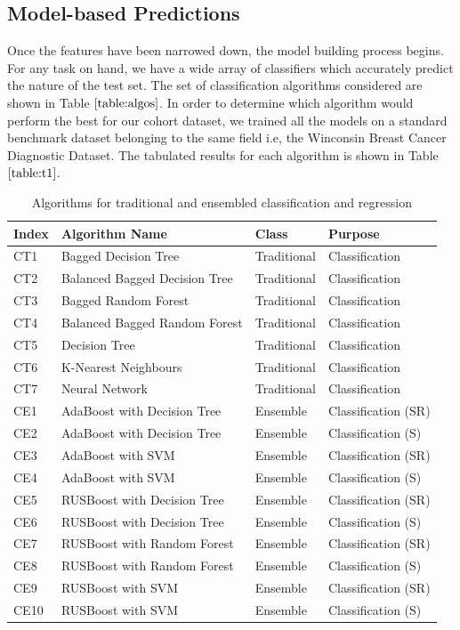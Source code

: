 \documentclass[10pt,journal,compsoc]{IEEEtran}
\begin{document}
\subsection{Model-based Predictions}

Once the features have been narrowed down, the model building process begins. For any task on hand, we have a wide array of classifiers which accurately predict the nature of the test set. The set of classification algorithms considered are shown in Table $\ref{table:algos}$. In order to determine which algorithm would perform the best for our cohort dataset, we trained all the models on a standard benchmark dataset belonging to the same field i.e, the Winconsin Breast Cancer Diagnostic Dataset. The tabulated results for each algorithm is shown in Table $\ref{table:t1}$.

\begin{table}[!t]
\caption{Algorithms for traditional and ensembled classification and regression}
\label{table:algos}
\centering
\scalebox{0.88}
{
\begin{tabular}{| l | l | l | l | }
\hline
\textbf{Index} & \textbf{Algorithm Name} & \textbf{Class} & \textbf{Purpose} \\
\hline
CT1 & Bagged Decision Tree & Traditional & Classification \\
\hline
CT2 & Balanced Bagged Decision Tree & Traditional &  Classification \\
\hline
CT3 & Bagged Random Forest & Traditional &  Classification \\
\hline
CT4 & Balanced Bagged Random Forest & Traditional & Classification \\
\hline
CT5 & Decision Tree & Traditional & Classification \\
\hline
CT6 & K-Nearest Neighbours & Traditional & Classification \\
\hline
CT7 & Neural Network & Traditional & Classification \\
\hline
CE1 & AdaBoost with Decision Tree & Ensemble & Classification (SR)\\
\hline
CE2 & AdaBoost with Decision Tree & Ensemble & Classification (S)\\
\hline
CE3 & AdaBoost with SVM & Ensemble & Classification (SR)\\
\hline
CE4 & AdaBoost with SVM & Ensemble & Classification (S)\\
\hline
CE5 & RUSBoost with Decision Tree & Ensemble & Classification (SR)\\
\hline
CE6 & RUSBoost with Decision Tree & Ensemble & Classification (S)\\
\hline
CE7 & RUSBoost with Random Forest & Ensemble & Classification (SR)\\
\hline
CE8 & RUSBoost with Random Forest & Ensemble & Classification (S)\\
\hline
CE9 & RUSBoost with SVM & Ensemble & Classification (SR)\\
\hline
CE10 & RUSBoost with SVM & Ensemble & Classification (S)\\
\hline
\end{tabular}
}
\end{table}
\end{document}
